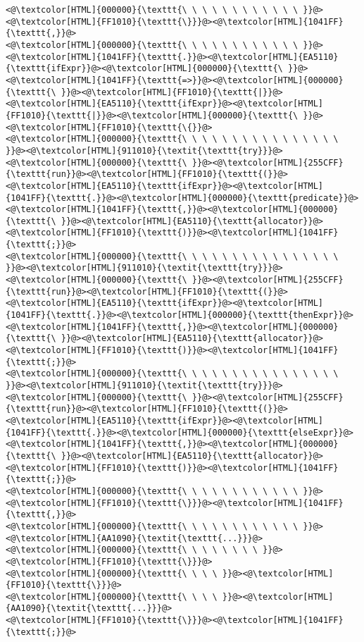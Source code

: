 \begin{lstlisting}
<@\textcolor[HTML]{000000}{\texttt{\ \ \ \ \ \ \ \ \ \ \ \ }}@><@\textcolor[HTML]{FF1010}{\texttt{\}}}@><@\textcolor[HTML]{1041FF}{\texttt{,}}@>
<@\textcolor[HTML]{000000}{\texttt{\ \ \ \ \ \ \ \ \ \ \ \ }}@><@\textcolor[HTML]{1041FF}{\texttt{.}}@><@\textcolor[HTML]{EA5110}{\texttt{ifExpr}}@><@\textcolor[HTML]{000000}{\texttt{\ }}@><@\textcolor[HTML]{1041FF}{\texttt{=>}}@><@\textcolor[HTML]{000000}{\texttt{\ }}@><@\textcolor[HTML]{FF1010}{\texttt{|}}@><@\textcolor[HTML]{EA5110}{\texttt{ifExpr}}@><@\textcolor[HTML]{FF1010}{\texttt{|}}@><@\textcolor[HTML]{000000}{\texttt{\ }}@><@\textcolor[HTML]{FF1010}{\texttt{\{}}@>
<@\textcolor[HTML]{000000}{\texttt{\ \ \ \ \ \ \ \ \ \ \ \ \ \ \ \ }}@><@\textcolor[HTML]{911010}{\textit{\texttt{try}}}@><@\textcolor[HTML]{000000}{\texttt{\ }}@><@\textcolor[HTML]{255CFF}{\texttt{run}}@><@\textcolor[HTML]{FF1010}{\texttt{(}}@><@\textcolor[HTML]{EA5110}{\texttt{ifExpr}}@><@\textcolor[HTML]{1041FF}{\texttt{.}}@><@\textcolor[HTML]{000000}{\texttt{predicate}}@><@\textcolor[HTML]{1041FF}{\texttt{,}}@><@\textcolor[HTML]{000000}{\texttt{\ }}@><@\textcolor[HTML]{EA5110}{\texttt{allocator}}@><@\textcolor[HTML]{FF1010}{\texttt{)}}@><@\textcolor[HTML]{1041FF}{\texttt{;}}@>
<@\textcolor[HTML]{000000}{\texttt{\ \ \ \ \ \ \ \ \ \ \ \ \ \ \ \ }}@><@\textcolor[HTML]{911010}{\textit{\texttt{try}}}@><@\textcolor[HTML]{000000}{\texttt{\ }}@><@\textcolor[HTML]{255CFF}{\texttt{run}}@><@\textcolor[HTML]{FF1010}{\texttt{(}}@><@\textcolor[HTML]{EA5110}{\texttt{ifExpr}}@><@\textcolor[HTML]{1041FF}{\texttt{.}}@><@\textcolor[HTML]{000000}{\texttt{thenExpr}}@><@\textcolor[HTML]{1041FF}{\texttt{,}}@><@\textcolor[HTML]{000000}{\texttt{\ }}@><@\textcolor[HTML]{EA5110}{\texttt{allocator}}@><@\textcolor[HTML]{FF1010}{\texttt{)}}@><@\textcolor[HTML]{1041FF}{\texttt{;}}@>
<@\textcolor[HTML]{000000}{\texttt{\ \ \ \ \ \ \ \ \ \ \ \ \ \ \ \ }}@><@\textcolor[HTML]{911010}{\textit{\texttt{try}}}@><@\textcolor[HTML]{000000}{\texttt{\ }}@><@\textcolor[HTML]{255CFF}{\texttt{run}}@><@\textcolor[HTML]{FF1010}{\texttt{(}}@><@\textcolor[HTML]{EA5110}{\texttt{ifExpr}}@><@\textcolor[HTML]{1041FF}{\texttt{.}}@><@\textcolor[HTML]{000000}{\texttt{elseExpr}}@><@\textcolor[HTML]{1041FF}{\texttt{,}}@><@\textcolor[HTML]{000000}{\texttt{\ }}@><@\textcolor[HTML]{EA5110}{\texttt{allocator}}@><@\textcolor[HTML]{FF1010}{\texttt{)}}@><@\textcolor[HTML]{1041FF}{\texttt{;}}@>
<@\textcolor[HTML]{000000}{\texttt{\ \ \ \ \ \ \ \ \ \ \ \ }}@><@\textcolor[HTML]{FF1010}{\texttt{\}}}@><@\textcolor[HTML]{1041FF}{\texttt{,}}@>
<@\textcolor[HTML]{000000}{\texttt{\ \ \ \ \ \ \ \ \ \ \ \ }}@><@\textcolor[HTML]{AA1090}{\textit{\texttt{...}}}@>
<@\textcolor[HTML]{000000}{\texttt{\ \ \ \ \ \ \ \ }}@><@\textcolor[HTML]{FF1010}{\texttt{\}}}@>
<@\textcolor[HTML]{000000}{\texttt{\ \ \ \ }}@><@\textcolor[HTML]{FF1010}{\texttt{\}}}@>
<@\textcolor[HTML]{000000}{\texttt{\ \ \ \ }}@><@\textcolor[HTML]{AA1090}{\textit{\texttt{...}}}@>
<@\textcolor[HTML]{FF1010}{\texttt{\}}}@><@\textcolor[HTML]{1041FF}{\texttt{;}}@>


\end{lstlisting}
